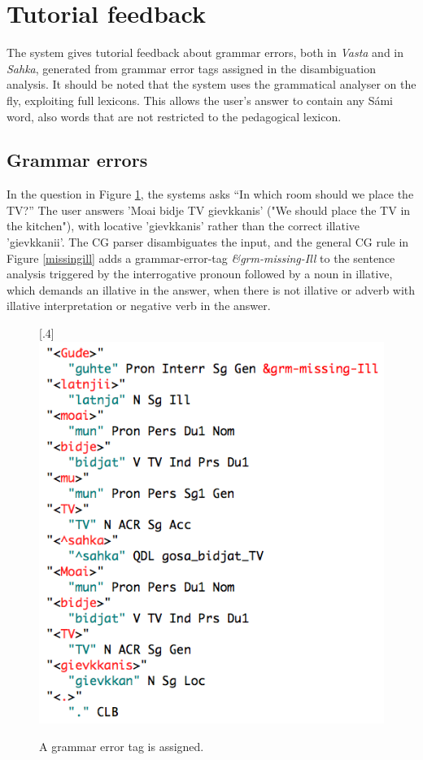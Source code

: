 \documentclass[11pt]{article}
\begin{document}
\section{Tutorial feedback} \label{tutorial}
The system gives tutorial feedback about grammar errors, both in \textit{Vasta} and in \textit{Sahka}, generated from grammar error tags assigned in the disambiguation analysis. It should be noted that the system uses the grammatical analyser on the fly, exploiting full lexicons. This allows the user's answer to contain any Sámi word, also words that are not restricted to the pedagogical lexicon.

\subsection{Grammar errors} \label{grammarerrors}
In the question in Figure \ref{hivssetloc}, the systems asks “In which room should we place the TV?” The user answers 'Moai bidje TV gievkkanis' ("We should place the TV in the kitchen"), with locative 'gievkkanis' rather than the correct illative 'gievkkanii'. The CG parser disambiguates the input, and the general CG rule in Figure \ref{missingill} adds a grammar-error-tag \textit{\&grm-missing-Ill} to the sentence analysis triggered by the interrogative pronoun followed by a noun in illative, which demands an illative in the answer, when there is not illative or adverb with illative interpretation or negative verb in the answer.  \\ 

\begin{figure}[htbp]
\begin{center}
\scalebox{.4}[.4]{\includegraphics{presentation/img/gievkkanisAnal.png}}\\
\caption{A grammar error tag is assigned. }
\label{hivssetloc}
\end{center}
\end{figure}
\end{document}
